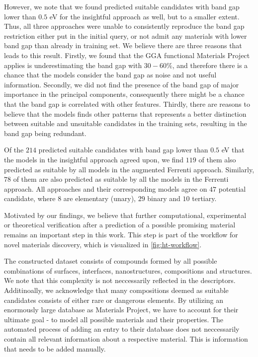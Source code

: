 However, we note that we found predicted suitable candidates with band gap lower than $0.5$ eV for the insightful approach as well, but to a smaller extent. Thus, all three approaches were unable to consistently reproduce the band gap restriction either put in the initial query, or not admit any materials with lower band gap than already in training set. We believe there are three reasons that leads to this result. Firstly, we found that the GGA functional Materials Project applies is underestimating the band gap with $30-60\%$, and therefore there is a chance that the models consider the band gap as noise and not useful information. Secondly, we did not find the presence of the band gap of major importance in the principal components, consequently there might be a chance that the band gap is correlated with other features. Thirdly, there are reasons to believe that the models finds other patterns that represents a better distinction between suitable and unsuitable candidates in the training sets, resulting in the band gap being redundant.

Of the $214$ predicted suitable candidates with band gap lower than $0.5$ eV that the models in the insightful approach agreed upon, we find $119$ of them also predicted as suitable by all models in the augmented Ferrenti approach. Similarly, $78$ of them are also predicted as suitable by all the models in the Ferrenti approach. All approaches and their corresponding models agree on $47$ potential candidate, where $8$ are elementary (unary), $29$ binary and $10$ tertiary.

Motivated by our findings, we believe that further computational, experimental or theoretical verification after a prediction of a possible promising material remains an important step in this work. This step is part of the workflow for novel materials discovery, which is visualized in \autoref{fig:ht-workflow}.

The constructed dataset consists of compounds formed by all possible combinations of surfaces, interfaces, nanostructures, compositions and structures. We note that this complexity is not neccessarily reflected in the descriptors. Additinoally, we acknowledge that many compositions deemed as suitable candidates consists of either rare or dangerous elements. By utilizing an enormously large database as Materials Project, we have to account for their ultimate goal - to model all possible materials and their properties. The automated process of adding an entry to their database does not neccessarily contain all relevant information about a respective material. This is information that needs to be added manually.

